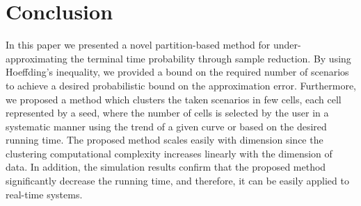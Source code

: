 \documentclass[11pt,letterpaper]{article}
\begin{document}
	
	
	
	\section{Conclusion} \label{sec:Conclusion}  
	In this paper we presented a novel partition-based method for under-approximating the terminal time probability through sample reduction. By using Hoeffding's inequality, we provided a bound on the required number of scenarios to achieve a desired probabilistic bound on the approximation error. Furthermore, we proposed a method which clusters the taken scenarios in few cells, each cell represented by a seed, where the number of cells is selected by the user in a systematic manner using the trend of a given curve or based on the desired running time. The proposed method scales easily with dimension since the clustering computational complexity increases linearly with the dimension of data. In addition, the simulation results confirm that the proposed method significantly decrease the running time, and therefore, it can be easily applied to real-time systems.  
	
	
	
\end{document}
